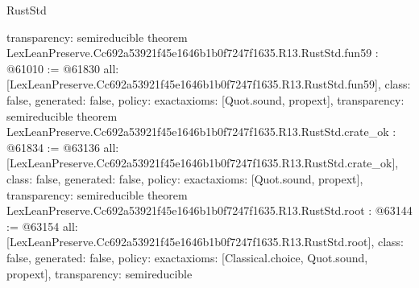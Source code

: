 \begin{lexlean}{RustStd}
\begin{coremodule}
{  transparency: semireducible
}
theorem LexLeanPreserve.Cc692a53921f45e1646b1b0f7247f1635.R13.RustStd.fun59 : @61010 := @61830 {
  all: [LexLeanPreserve.Cc692a53921f45e1646b1b0f7247f1635.R13.RustStd.fun59],
  class: false,
  generated: false,
  policy: exact{axioms: [Quot.sound, propext]},
  transparency: semireducible
}
theorem LexLeanPreserve.Cc692a53921f45e1646b1b0f7247f1635.R13.RustStd.crate_ok : @61834 := @63136 {
  all: [LexLeanPreserve.Cc692a53921f45e1646b1b0f7247f1635.R13.RustStd.crate_ok],
  class: false,
  generated: false,
  policy: exact{axioms: [Quot.sound, propext]},
  transparency: semireducible
}
theorem LexLeanPreserve.Cc692a53921f45e1646b1b0f7247f1635.R13.RustStd.root : @63144 := @63154 {
  all: [LexLeanPreserve.Cc692a53921f45e1646b1b0f7247f1635.R13.RustStd.root],
  class: false,
  generated: false,
  policy: exact{axioms: [Classical.choice, Quot.sound, propext]},
  transparency: semireducible
}


\end{coremodule}
\end{lexlean}
